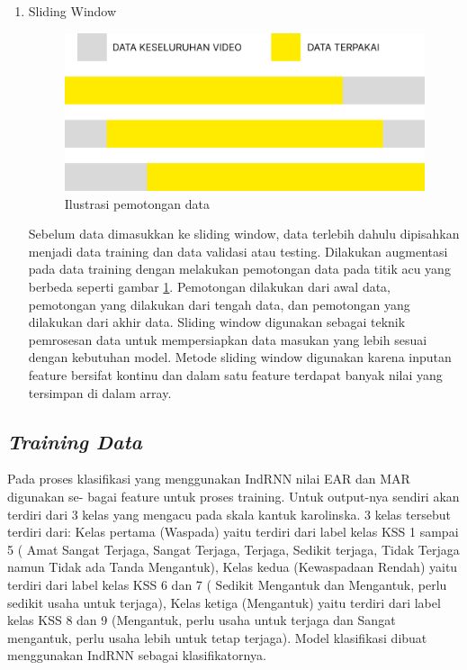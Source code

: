 \begin{enumerate}[nolistsep]
      \item Sliding Window

            \begin{figure} [H] \centering
                  \includegraphics[scale=0.15]{gambar/PotongData.png}
                  \caption{Ilustrasi pemotongan data}
                  \label{fig:potong}
            \end{figure}
            Sebelum data dimasukkan ke sliding window, data terlebih dahulu dipisahkan menjadi data training dan data validasi atau
            testing. Dilakukan augmentasi pada data training dengan melakukan pemotongan data pada titik acu yang berbeda seperti gambar \ref{fig:potong}.
            Pemotongan dilakukan dari awal data, pemotongan yang dilakukan dari tengah data, dan pemotongan yang dilakukan
            dari akhir data. Sliding window digunakan sebagai teknik pemrosesan data untuk mempersiapkan data masukan yang lebih
            sesuai dengan kebutuhan model.  Metode sliding window digunakan karena inputan feature bersifat kontinu dan dalam satu
            feature terdapat banyak nilai yang tersimpan di dalam array.
\end{enumerate}

\subsection{\emph{Training Data}}
Pada proses klasifikasi yang menggunakan IndRNN nilai EAR dan MAR digunakan se-
bagai feature untuk proses training. Untuk output-nya sendiri akan terdiri dari 3 kelas yang
mengacu pada skala kantuk karolinska. 3 kelas tersebut terdiri dari: Kelas pertama (Waspada)
yaitu terdiri dari label kelas KSS 1 sampai 5 ( Amat Sangat Terjaga, Sangat Terjaga, Terjaga,
Sedikit terjaga, Tidak Terjaga namun Tidak ada Tanda Mengantuk), Kelas kedua (Kewaspadaan
Rendah) yaitu terdiri dari label kelas KSS 6 dan 7 ( Sedikit Mengantuk dan Mengantuk, perlu
sedikit usaha untuk terjaga), Kelas ketiga (Mengantuk) yaitu terdiri dari label kelas KSS 8 dan
9 (Mengantuk, perlu usaha untuk terjaga dan Sangat mengantuk, perlu usaha lebih untuk tetap
terjaga). Model klasifikasi dibuat menggunakan IndRNN sebagai klasifikatornya.

